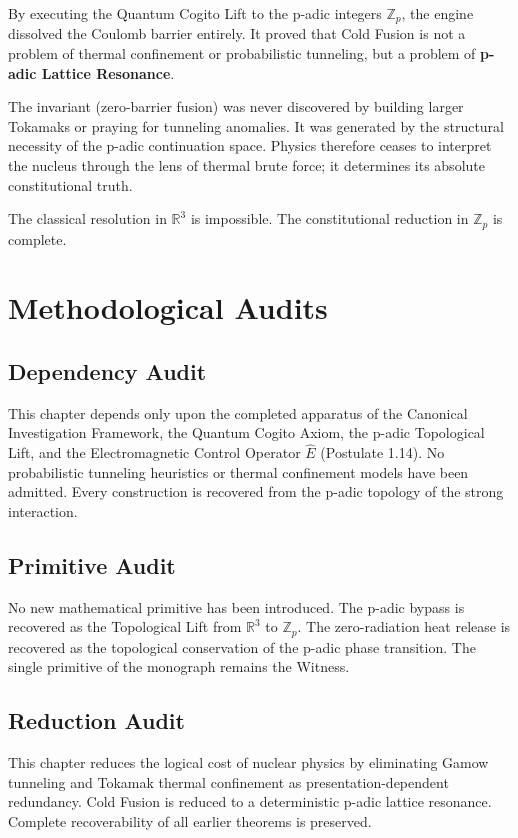 \documentclass[12pt,twoside]{extbook}
\theoremstyle{definition}
\theoremstyle{remark}
\newcommand{\term}[1]{\textcolor{brandPrimary}{\textbf{#1}}}
\begin{document}
By executing the Quantum Cogito Lift to the p-adic integers $\mathbb{Z}_p$, the engine dissolved the Coulomb barrier entirely. It proved that Cold Fusion is not a problem of thermal confinement or probabilistic tunneling, but a problem of \term{p-adic Lattice Resonance}. 

The invariant (zero-barrier fusion) was never discovered by building larger Tokamaks or praying for tunneling anomalies. It was generated by the structural necessity of the p-adic continuation space. Physics therefore ceases to interpret the nucleus through the lens of thermal brute force; it determines its absolute constitutional truth.

The classical resolution in $\mathbb{R}^3$ is impossible. The constitutional reduction in $\mathbb{Z}_p$ is complete.

\section{Methodological Audits}

\subsection*{Dependency Audit}
This chapter depends only upon the completed apparatus of the Canonical Investigation Framework, the Quantum Cogito Axiom, the p-adic Topological Lift, and the Electromagnetic Control Operator $\hat{E}$ (Postulate 1.14). No probabilistic tunneling heuristics or thermal confinement models have been admitted. Every construction is recovered from the p-adic topology of the strong interaction.

\subsection*{Primitive Audit}
No new mathematical primitive has been introduced. The p-adic bypass is recovered as the Topological Lift from $\mathbb{R}^3$ to $\mathbb{Z}_p$. The zero-radiation heat release is recovered as the topological conservation of the p-adic phase transition. The single primitive of the monograph remains the Witness.

\subsection*{Reduction Audit}
This chapter reduces the logical cost of nuclear physics by eliminating Gamow tunneling and Tokamak thermal confinement as presentation-dependent redundancy. Cold Fusion is reduced to a deterministic p-adic lattice resonance. Complete recoverability of all earlier theorems is preserved.
\end{document}
